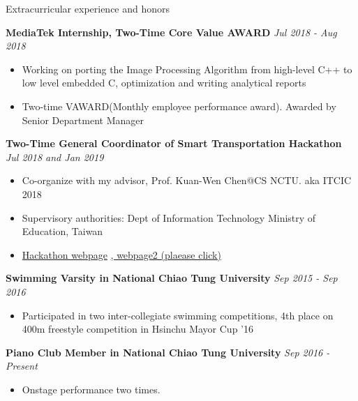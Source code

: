 \documentclass{resume} %
\begin{document}
\begin{rSection}{Extracurricular experience and honors}

{\bf MediaTek Internship, Two-Time Core Value AWARD} \hfill {\em Jul 2018 - Aug 2018}
\begin{itemize}
    \item Working on porting the Image Processing Algorithm from high-level C++ to low level embedded C, optimization and writing analytical reports
    \item Two-time VAWARD(Monthly employee performance award). Awarded by Senior Department Manager
\end{itemize}

{\bf Two-Time General Coordinator of Smart Transportation Hackathon } \hfill {\em Jul 2018 and Jan 2019}
\begin{itemize}
    \item Co-organize with my advisor, Prof. Kuan-Wen Chen@CS NCTU. aka ITCIC 2018
    \item Supervisory authorities: Dept of Information Technology Ministry of Education, Taiwan
    \item \href{http://covis.cs.nctu.edu.tw/ITCIC2018/}{Hackathon webpage} \href{http://covis.cs.nctu.edu.tw/ITCIC2018/}{, webpage2 (plaease click)}
\end{itemize}

{\bf Swimming Varsity in National Chiao Tung University} \hfill {\em Sep 2015 - Sep 2016}
\begin{itemize}
    \item Participated in two inter-collegiate swimming competitions, 4th place on 400m freestyle competition in Hsinchu Mayor Cup '16
\end{itemize}

{\bf Piano Club Member in National Chiao Tung University} \hfill {\em Sep 2016 - Present}
\begin{itemize}
    \item Onstage performance two times.
\end{itemize}

\end{rSection}
\end{document}
